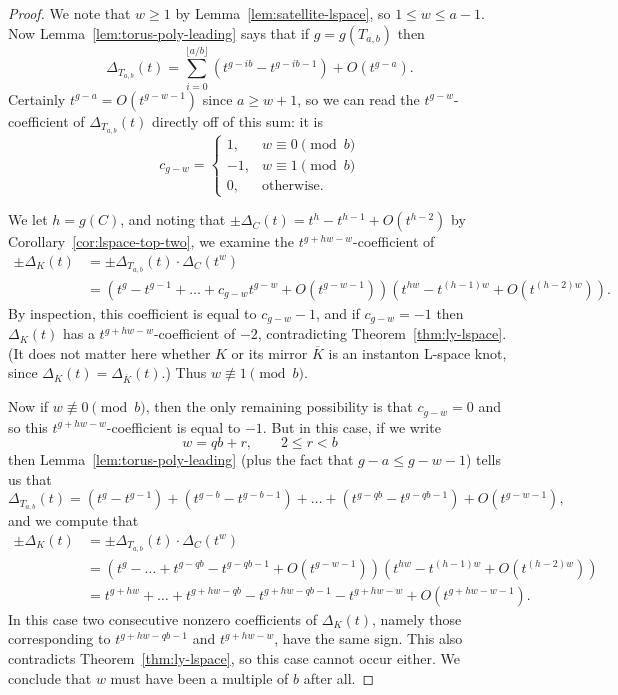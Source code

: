 \documentclass[11pt]{amsart}
\numberwithin{equation}{section}
\numberwithin{theorem}{section}
\theoremstyle{definition}
\newcommand{\mirror}[1]{\overline{#1}}
\begin{document}
\begin{proof}
We note that $w \geq 1$ by Lemma~\ref{lem:satellite-lspace}, so $1 \leq w \leq a-1$.  Now Lemma~\ref{lem:torus-poly-leading} says that if $g=g(T_{a,b})$ then
\[ \Delta_{T_{a,b}}(t) = \sum_{i=0}^{\lfloor a/b\rfloor} (t^{g-ib} - t^{g-ib-1}) + O(t^{g-a}). \]
Certainly $t^{g-a} = O(t^{g-w-1})$ since $a \geq w+1$, so we can read the $t^{g-w}$-coefficient of $\Delta_{T_{a,b}}(t)$ directly off of this sum: it is
\[ c_{g-w} = \begin{cases} 
1, & w\equiv0 \pmod{b} \\
-1, & w\equiv1 \pmod{b} \\
0, & \text{otherwise}.
\end{cases} \]

We let $h=g(C)$, and noting that $\pm \Delta_C(t) = t^h - t^{h-1} + O(t^{h-2})$ by Corollary~\ref{cor:lspace-top-two}, we examine the $t^{g+hw-w}$-coefficient of 
\begin{align*}
\pm\Delta_K(t) &= \pm \Delta_{T_{a,b}}(t) \cdot \Delta_{C}(t^w) \\
&= \left(t^g - t^{g-1} + \dots + c_{g-w}t^{g-w} + O(t^{g-w-1}) \right) \left(t^{hw} - t^{(h-1)w} + O(t^{(h-2)w})\right).
\end{align*}
By inspection, this coefficient is equal to $c_{g-w} - 1$, and if $c_{g-w}=-1$ then $\Delta_K(t)$ has a $t^{g+hw-w}$-coefficient of $-2$, contradicting Theorem~\ref{thm:ly-lspace}.  (It does not matter here whether $K$ or its mirror $\mirror{K}$ is an instanton L-space knot, since $\Delta_K(t) = \Delta_{\mirror{K}}(t)$.)  Thus $w \not\equiv 1\pmod{b}$.

Now if $w\not\equiv 0 \pmod{b}$, then the only remaining possibility is that $c_{g-w}=0$ and so this $t^{g+hw-w}$-coefficient is equal to $-1$.  But in this case, if we write
\[ w = qb + r, \qquad 2 \leq r < b \]
then Lemma~\ref{lem:torus-poly-leading} (plus the fact that $g-a \leq g-w-1$)  tells us that
\[ \Delta_{T_{a,b}}(t) = (t^g - t^{g-1}) + (t^{g-b}-t^{g-b-1}) + \dots + (t^{g-qb}-t^{g-qb-1}) + O(t^{g-w-1}), \]
and  we compute that
\begin{align*}
\pm\Delta_K(t) &= \pm\Delta_{T_{a,b}}(t) \cdot \Delta_{C}(t^w) \\
&= \left(t^g - \dots + t^{g-qb} - t^{g-qb-1} + O(t^{g-w-1}) \right) \left(t^{hw} - t^{(h-1)w} + O(t^{(h-2)w})\right) \\
&= t^{g+hw} + \dots + t^{g+hw-qb} - t^{g+hw-qb-1} - t^{g+hw-w} + O(t^{g+hw-w-1}).
\end{align*}
In this case two consecutive nonzero coefficients of $\Delta_K(t)$, namely those corresponding to $t^{g+hw-qb-1}$ and $t^{g+hw-w}$, have the same sign.  This also contradicts Theorem~\ref{thm:ly-lspace}, so this case cannot occur either.  We conclude that $w$ must have been a multiple of $b$ after all.
\end{proof}
\end{document}
